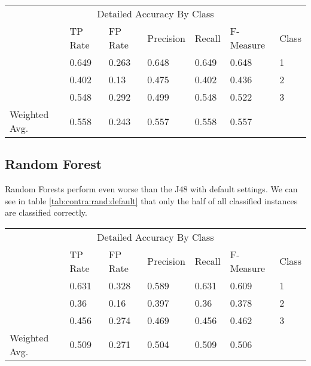 \documentclass[paper=a4, fontsize=11pt]{scrartcl} %
\numberwithin{equation}{section} %
\numberwithin{figure}{section} %
\numberwithin{table}{section} %
\begin{document}
 
\begin{table*}[htb]\centering
  \begin{tabular*}{\columnwidth}{@{}lllllll@{}}
      \toprule 
      \multicolumn{7}{c}{Detailed Accuracy By Class} \\ 
               &  TP Rate & FP Rate & Precision & Recall & F-Measure &  Class \\ \midrule   
               &  0.649   & 0.263   & 0.648     & 0.649  & 0.648     &  1     \\    
               &  0.402   & 0.13    & 0.475     & 0.402  & 0.436     &  2     \\        
               &  0.548   & 0.292   & 0.499     & 0.548  & 0.522     &  3     \\    
Weighted Avg.  &  0.558   & 0.243   & 0.557     & 0.558  & 0.557     &        \\ \bottomrule 
    \end{tabular*}
\caption{Decision Tree on Contraceptive Data Set -- using binary splits} 
\label{tab:contra:dec:bin}
\end{table*}
\FloatBarrier

\subsection{Random Forest}
Random Forests perform even worse than the J48 with default settings. We can see in table \ref{tab:contra:rand:default} that only the half of all classified instances are classified correctly.

\begin{table*}[htb]\centering
  \begin{tabular*}{\columnwidth}{@{}lllllll@{}}
      \toprule 
      \multicolumn{7}{c}{Detailed Accuracy By Class} \\ 
               &  TP Rate & FP Rate & Precision & Recall & F-Measure  & Class  \\  \midrule      
               &  0.631   & 0.328   & 0.589     & 0.631  & 0.609      & 1      \\       
               &  0.36    & 0.16    & 0.397     & 0.36   & 0.378      & 2      \\       
               &  0.456   & 0.274   & 0.469     & 0.456  & 0.462      & 3      \\       
Weighted Avg.  &  0.509   & 0.271   & 0.504     & 0.509  & 0.506      &        \\  \bottomrule     
    \end{tabular*}
\caption{Random Forests on Contraceptive Data Set -- Default Settings} 
\label{tab:contra:rand:default}
\end{table*}
\FloatBarrier
\end{document}
